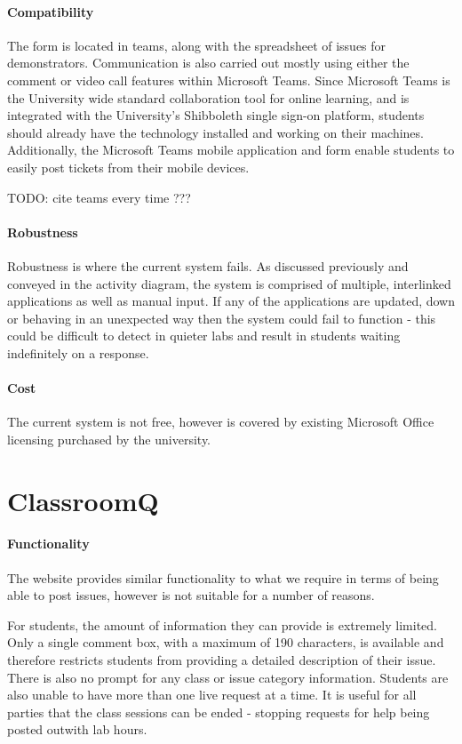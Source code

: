 \paragraph{Compatibility}  
The form is located in teams, along with the spreadsheet of issues for demonstrators. Communication is also carried out mostly using either the comment or video call features within Microsoft Teams. Since Microsoft Teams is the University wide standard collaboration tool for online learning, and is integrated with the University's Shibboleth \cite{shib} single sign-on platform, students should already have the technology installed and working on their machines. Additionally, the Microsoft Teams mobile application and form enable students to easily post tickets from their mobile devices.

TODO: cite teams every time ???

\paragraph{Robustness}
Robustness is where the current system fails. As discussed previously and conveyed in the activity diagram, the system is comprised of multiple, interlinked applications as well as manual input. If any of the applications are updated, down or behaving in an unexpected way then the system could fail to function - this could be difficult to detect in quieter labs and result in students waiting indefinitely on a response.


\paragraph{Cost}  
The current system is not free, however is covered by existing Microsoft Office licensing purchased by the university.  

\newpage
\section{ClassroomQ}

\paragraph{Functionality}
The website provides similar functionality to what we require in terms of being able to post issues, however is not suitable for a number of reasons.

For students, the amount of information they can provide is extremely limited. Only a single comment box, with a maximum of 190 characters, is available and therefore restricts students from providing a detailed description of their issue. There is also no prompt for any class or issue category information. Students are also unable to have more than one live request at a time. It is useful for all parties that the class sessions can be ended - stopping requests for help being posted outwith lab hours.

